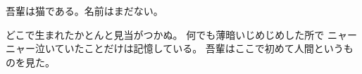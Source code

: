 \documentclass{jsarticle}
\begin{document}
吾輩は猫である。名前はまだない。

どこで生まれたかとんと見当がつかぬ。
何でも薄暗いじめじめした所で
ニャーニャー泣いていたことだけは記憶している。
吾輩はここで初めて人間というものを見た。
\end{document}
